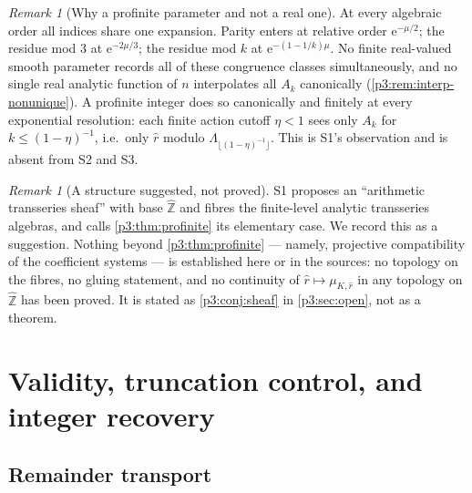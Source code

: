 \documentclass[11pt,a4paper,oneside]{book}
\theoremstyle{plain}
\theoremstyle{definition}
\theoremstyle{remark}
\newtheorem{remark}[theorem]{Remark}
\newcommand{\Int}{\mathbb{Z}}
\newcommand{\e}{\mathrm{e}}
\begin{document}
\begin{remark}[Why a profinite parameter and not a real one]
\label{p3:rem:why-profinite}
At every algebraic order all indices share one expansion. Parity enters at relative order
$\e^{-\mu/2}$; the residue mod $3$ at $\e^{-2\mu/3}$; the residue mod $k$ at $\e^{-(1-1/k)\mu}$.
No finite real-valued smooth parameter records all of these congruence classes simultaneously, and
no single real analytic function of $n$ interpolates all $A_{k}$ canonically
(\cref{p3:rem:interp-nonunique}). A profinite integer does so canonically and finitely at every
exponential resolution: each finite action cutoff $\eta<1$ sees only $A_{k}$ for
$k\le(1-\eta)^{-1}$, i.e.\ only $\widehat r$ modulo $\Lambda_{\lfloor(1-\eta)^{-1}\rfloor}$. This
is S1's observation and is absent from S2 and S3.
\end{remark}

\begin{remark}[A structure suggested, not proved]\label{p3:rem:sheaf-conjecture}
S1 proposes an ``arithmetic transseries sheaf'' with base $\widehat{\Int}$ and fibres the
finite-level analytic transseries algebras, and calls \cref{p3:thm:profinite} its elementary case.
We record this as a suggestion. Nothing beyond \cref{p3:thm:profinite} --- namely, projective
compatibility of the coefficient systems --- is established here or in the sources: no topology on
the fibres, no gluing statement, and no continuity of $\widehat r\mapsto\mu_{K,\widehat r}$ in any
topology on $\widehat{\Int}$ has been proved. It is stated as \cref{p3:conj:sheaf} in
\cref{p3:sec:open}, not as a theorem.
\end{remark}

\section{Validity, truncation control, and integer recovery}
\label{p3:sec:validity}

\subsection{Remainder transport}
\end{document}
